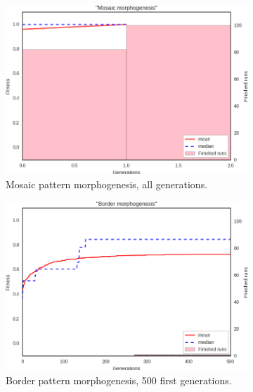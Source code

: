 \begin{figure}[t]
\centering
\begin{subfigure}[t]{.45\columnwidth}
\centering
\includegraphics[width=\columnwidth]{fig/generate_mosaic_results}
\caption{Mosaic pattern morphogenesis, all generations.}
\label{fig:generate_mosaic_results}
\end{subfigure}
\begin{subfigure}[t]{.45\columnwidth}
\centering
\includegraphics[width=\columnwidth]{fig/generate_border_results}
\caption{Border pattern morphogenesis, 500 first generations.
}
\label{fig:generate_border_results}
\end{subfigure}
\begin{subfigure}[t]{.45\columnwidth}
\centering

\end{subfigure}
\end{figure}
